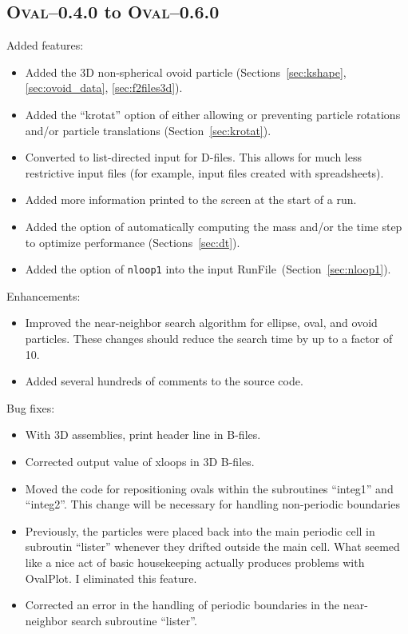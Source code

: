 \documentclass[letterpaper,11pt]{article}
\newcommand{\Oval}{\textsc{Oval}}
\newcommand{\RunFile}{\textsf{RunFile}}
\begin{document}
\subsection{\Oval--0.4.0 to \Oval--0.6.0}\label{sec:oval04_to_oval06}
Added features:
\begin{itemize}
\item
Added the 3D non-spherical ovoid particle (Sections~\ref{sec:kshape},
\ref{sec:ovoid_data}, \ref{sec:f2files3d}).
\item
Added the ``krotat'' option of either allowing or preventing particle rotations
and/or particle translations (Section~\ref{sec:krotat}).
\item
Converted to list-directed input for D-files.  This allows
for much less restrictive input files (for example, input
files created with spreadsheets).
\item
Added more information printed to the screen at the start
of a run.
\item
Added the option of automatically computing the mass and/or the time step to
optimize performance (Sections~\ref{sec:dt}).
\item
Added the option of \texttt{nloop1} into the 
input \RunFile\ (Section~\ref{sec:nloop1}).
\end{itemize}
Enhancements:
\begin{itemize}
\item
Improved the near-neighbor search algorithm for ellipse, oval, and
ovoid particles.  
These changes should reduce the search time by up to a factor of 10.
\item
Added several hundreds of comments to the source code.
\end{itemize}
Bug fixes:
\begin{itemize}
\item
With 3D assemblies, print header line in B-files.
\item
Corrected output value of xloops in 3D B-files.
\item
Moved the code for repositioning ovals within the subroutines
``integ1'' and ``integ2''.  This change will be necessary for handling
non-periodic boundaries
\item
Previously, the particles were placed back into the main
periodic cell in subroutin ``lister'' whenever they drifted
outside the main cell.  What seemed like a nice act of
basic housekeeping actually produces problems with OvalPlot.
I eliminated this feature.
\item
Corrected an error in the handling of periodic boundaries in the
near-neighbor search subroutine ``lister''.
\end{itemize}
%
%
\end{document}
